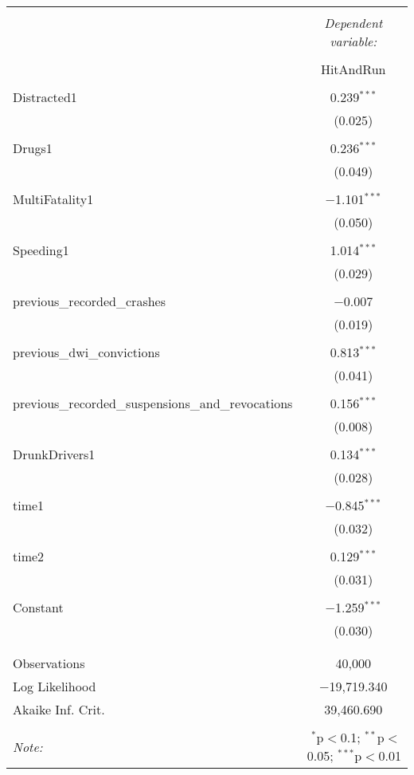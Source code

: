 \begin{table}[!htbp] \centering 
  \caption{} 
  \label{} 
\begin{tabular}{@{\extracolsep{5pt}}lc} 
\\[-1.8ex]\hline 
\hline \\[-1.8ex] 
 & \multicolumn{1}{c}{\textit{Dependent variable:}} \\ 
\cline{2-2} 
\\[-1.8ex] & HitAndRun \\ 
\hline \\[-1.8ex] 
 Distracted1 & 0.239$^{***}$ \\ 
  & (0.025) \\ 
  & \\ 
 Drugs1 & 0.236$^{***}$ \\ 
  & (0.049) \\ 
  & \\ 
 MultiFatality1 & $-$1.101$^{***}$ \\ 
  & (0.050) \\ 
  & \\ 
 Speeding1 & 1.014$^{***}$ \\ 
  & (0.029) \\ 
  & \\ 
 previous\_recorded\_crashes & $-$0.007 \\ 
  & (0.019) \\ 
  & \\ 
 previous\_dwi\_convictions & 0.813$^{***}$ \\ 
  & (0.041) \\ 
  & \\ 
 previous\_recorded\_suspensions\_and\_revocations & 0.156$^{***}$ \\ 
  & (0.008) \\ 
  & \\ 
 DrunkDrivers1 & 0.134$^{***}$ \\ 
  & (0.028) \\ 
  & \\ 
 time1 & $-$0.845$^{***}$ \\ 
  & (0.032) \\ 
  & \\ 
 time2 & 0.129$^{***}$ \\ 
  & (0.031) \\ 
  & \\ 
 Constant & $-$1.259$^{***}$ \\ 
  & (0.030) \\ 
  & \\ 
\hline \\[-1.8ex] 
Observations & 40,000 \\ 
Log Likelihood & $-$19,719.340 \\ 
Akaike Inf. Crit. & 39,460.690 \\ 
\hline 
\hline \\[-1.8ex] 
\textit{Note:}  & \multicolumn{1}{r}{$^{*}$p$<$0.1; $^{**}$p$<$0.05; $^{***}$p$<$0.01} \\ 
\end{tabular} 
\end{table} 
